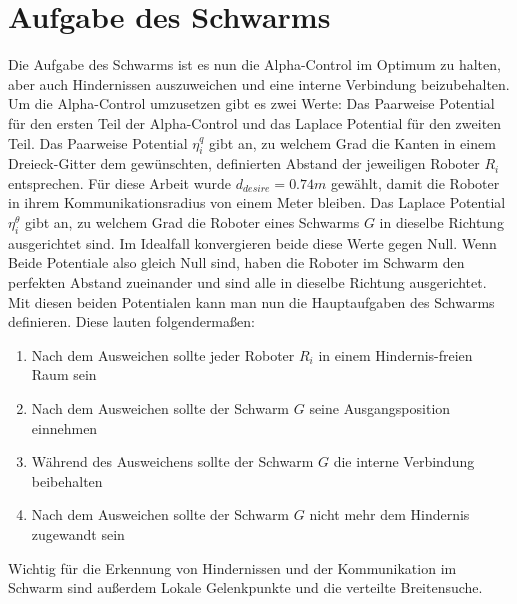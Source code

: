 \section{Aufgabe des Schwarms}

Die Aufgabe des Schwarms ist es nun die Alpha-Control im Optimum zu halten, aber auch 
Hindernissen auszuweichen und eine interne Verbindung beizubehalten. Um die Alpha-Control umzusetzen 
gibt es zwei Werte: Das Paarweise Potential für den ersten Teil der Alpha-Control und das Laplace 
Potential für den zweiten Teil. Das Paarweise Potential $\eta_i^q$ gibt an, zu welchem Grad die Kanten 
in einem Dreieck-Gitter dem gewünschten, definierten Abstand der jeweiligen Roboter $R_i$ entsprechen. 
Für diese Arbeit wurde $d_{desire}=0.74m$ gewählt, damit die Roboter in ihrem Kommunikationsradius 
von einem Meter bleiben. Das Laplace Potential $\eta_i^\theta$ gibt an, zu welchem Grad die Roboter 
eines Schwarms $G$ in dieselbe Richtung ausgerichtet sind. Im Idealfall konvergieren beide diese Werte 
gegen Null. Wenn Beide Potentiale also gleich Null sind,
haben die Roboter im Schwarm den perfekten Abstand zueinander und sind alle in dieselbe Richtung
ausgerichtet. Mit diesen beiden Potentialen kann man nun die Hauptaufgaben des Schwarms 
definieren. Diese lauten folgendermaßen:

\begin{enumerate}
    \item Nach dem Ausweichen sollte jeder Roboter $R_i$ in einem Hindernis-freien Raum sein
    \item Nach dem Ausweichen sollte der Schwarm $G$ seine Ausgangsposition einnehmen
    \item Während des Ausweichens sollte der Schwarm $G$ die interne Verbindung beibehalten
    \item Nach dem Ausweichen sollte der Schwarm $G$ nicht mehr dem Hindernis zugewandt sein
\end{enumerate}

Wichtig für die Erkennung von Hindernissen und der Kommunikation im Schwarm sind außerdem Lokale 
Gelenkpunkte und die verteilte Breitensuche.